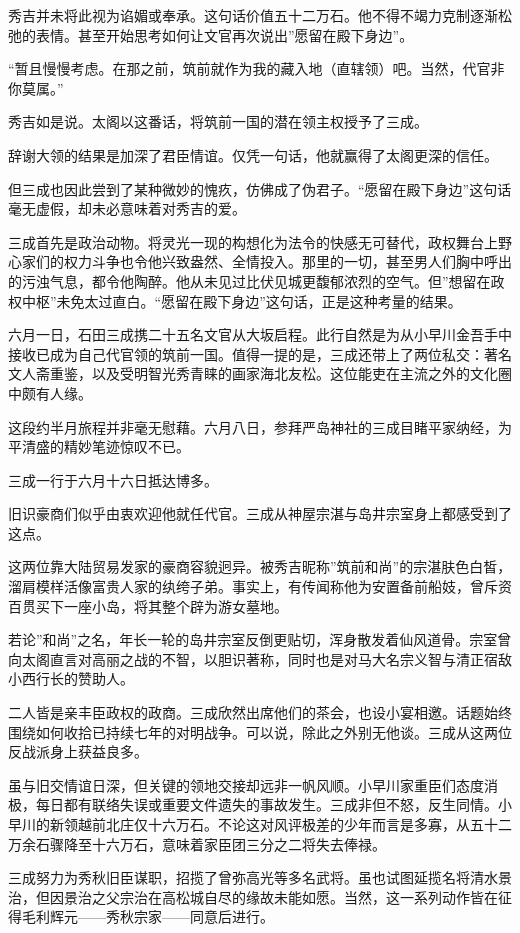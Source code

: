\documentclass[
]{book}
\begin{document}
秀吉并未将此视为谄媚或奉承。这句话价值五十二万石。他不得不竭力克制逐渐松弛的表情。甚至开始思考如何让文官再次说出''愿留在殿下身边''。

``暂且慢慢考虑。在那之前，筑前就作为我的藏入地（直辖领）吧。当然，代官非你莫属。''

秀吉如是说。太阁以这番话，将筑前一国的潜在领主权授予了三成。

辞谢大领的结果是加深了君臣情谊。仅凭一句话，他就赢得了太阁更深的信任。

但三成也因此尝到了某种微妙的愧疚，仿佛成了伪君子。``愿留在殿下身边''这句话毫无虚假，却未必意味着对秀吉的爱。

三成首先是政治动物。将灵光一现的构想化为法令的快感无可替代，政权舞台上野心家们的权力斗争也令他兴致盎然、全情投入。那里的一切，甚至男人们胸中呼出的污浊气息，都令他陶醉。他从未见过比伏见城更馥郁浓烈的空气。但''想留在政权中枢''未免太过直白。``愿留在殿下身边''这句话，正是这种考量的结果。

六月一日，石田三成携二十五名文官从大坂启程。此行自然是为从小早川金吾手中接收已成为自己代官领的筑前一国。值得一提的是，三成还带上了两位私交：著名文人斋重鉴，以及受明智光秀青睐的画家海北友松。这位能吏在主流之外的文化圈中颇有人缘。

这段约半月旅程并非毫无慰藉。六月八日，参拜严岛神社的三成目睹平家纳经，为平清盛的精妙笔迹惊叹不已。

三成一行于六月十六日抵达博多。

旧识豪商们似乎由衷欢迎他就任代官。三成从神屋宗湛与岛井宗室身上都感受到了这点。

这两位靠大陆贸易发家的豪商容貌迥异。被秀吉昵称''筑前和尚''的宗湛肤色白皙，溜肩模样活像富贵人家的纨绔子弟。事实上，有传闻称他为安置备前船妓，曾斥资百贯买下一座小岛，将其整个辟为游女墓地。

若论''和尚''之名，年长一轮的岛井宗室反倒更贴切，浑身散发着仙风道骨。宗室曾向太阁直言对高丽之战的不智，以胆识著称，同时也是对马大名宗义智与清正宿敌小西行长的赞助人。

二人皆是亲丰臣政权的政商。三成欣然出席他们的茶会，也设小宴相邀。话题始终围绕如何收拾已持续七年的对明战争。可以说，除此之外别无他谈。三成从这两位反战派身上获益良多。

虽与旧交情谊日深，但关键的领地交接却远非一帆风顺。小早川家重臣们态度消极，每日都有联络失误或重要文件遗失的事故发生。三成非但不怒，反生同情。小早川的新领越前北庄仅十六万石。不论这对风评极差的少年而言是多寡，从五十二万余石骤降至十六万石，意味着家臣团三分之二将失去俸禄。

三成努力为秀秋旧臣谋职，招揽了曾弥高光等多名武将。虽也试图延揽名将清水景治，但因景治之父宗治在高松城自尽的缘故未能如愿。当然，这一系列动作皆在征得毛利辉元------秀秋宗家------同意后进行。
\end{document}
